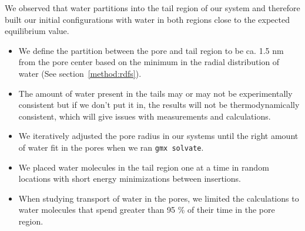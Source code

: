\documentclass{article}
\begin{document}
  We observed that water partitions into the tail region of our system and therefore
  built our initial configurations with water in both regions close to the expected
  equilibrium value.
  \begin{itemize}
    \item We define the partition between the pore and tail region to be ca. 1.5 nm from
    the pore center based on the minimum in the radial distribution of water (See section~\ref{method:rdfs}).
	\item The amount of water present in the tails may or may not be experimentally consistent
	but if we don't put it in, the results will not be thermodynamically consistent, which 
	will give issues with measurements and calculations.
	\item We iteratively adjusted the pore radius in our systems until the right amount of water
	fit in the pores when we ran \texttt{gmx solvate}.
	\item We placed water molecules in the tail region one at a time in random locations
	with short energy minimizations between insertions.
	\item When studying transport of water in the pores, we limited the calculations
	to water molecules that spend greater than 95 \% of their time in the pore region.
  \end{itemize}

\end{document}
